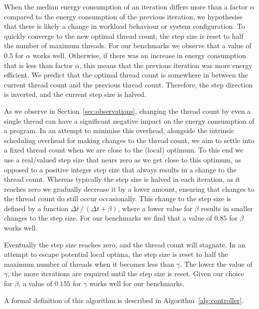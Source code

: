 When the median energy consumption of an iteration differs more than a factor $\alpha$ compared to the energy consumption of the previous iteration, we hypothesise that there is likely a change in workload behaviour or system configuration.
To quickly converge to the new optimal thread count, the step size is reset to half the number of maximum threads.
For our benchmarks we observe that a value of $0.5$ for $\alpha$ works well.
Otherwise, if there was an increase in energy consumption that is less than factor $\alpha$, this means that the previous iteration was more energy efficient.
We predict that the optimal thread count is somewhere in between the current thread count and the previous thread count.
Therefore, the step direction is inverted, and the current step size is halved.

As we observe in Section~\ref{sec:observations}, changing the thread count by even a single thread can have a significant negative impact on the energy consumption of a program.
In an attempt to minimise this overhead, alongside the intrinsic scheduling overhead for making changes to the thread count, we aim to settle into a fixed thread count when we are close to the (local) optimum.
To this end we use a real\-/valued step size that nears zero as we get close to this optimum, as opposed to a positive integer step size that always results in a change to the thread count.
Whereas typically the step size is halved in each iteration, as it reaches zero we gradually decrease it by a lower amount, ensuring that changes to the thread count do still occur occasionally.
This change to the step size is defined by a function $\Delta t\, /\, (\Delta t + \beta)$, where a lower value for $\beta$ results in smaller changes to the step size.
For our benchmarks we find that a value of $0.85$ for $\beta$ works well.

Eventually the step size reaches zero, and the thread count will stagnate.
In an attempt to escape potential local optima, the step size is reset to half the maximum number of threads when it becomes less than $\gamma$.
The lower the value of $\gamma$, the more iterations are required until the step size is reset.
Given our choice for $\beta$, a value of $0.155$ for $\gamma$ works well for our benchmarks.

A formal definition of this algorithm is described in Algorithm~\ref{alg:controller}.

